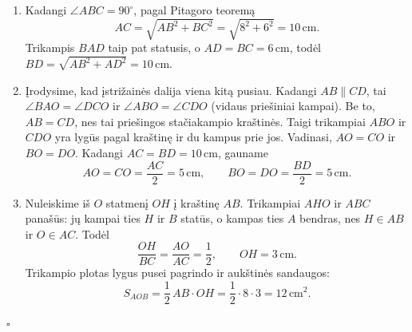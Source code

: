 \begin{sprendimas}
\begin{enumerate}[label=\alph*)]
\item Kadangi $\angle ABC=90^\circ$, pagal Pitagoro teoremą
\[
  AC=\sqrt{AB^2+BC^2}=\sqrt{8^2+6^2}=10\,\text{cm}.
\]
Trikampis $BAD$ taip pat statusis, o $AD=BC=6\,\text{cm}$, todėl
$BD=\sqrt{AB^2+AD^2}=10\,\text{cm}$.

\item Įrodysime, kad įstrižainės dalija viena kitą pusiau.
Kadangi $AB\parallel CD$, tai $\angle BAO=\angle DCO$ ir
$\angle ABO=\angle CDO$ (vidaus priešiniai kampai).
Be to, $AB=CD$, nes tai priešingos stačiakampio kraštinės.
Taigi trikampiai $ABO$ ir $CDO$ yra lygūs pagal kraštinę ir du
kampus prie jos. Vadinasi, $AO=CO$ ir $BO=DO$.
Kadangi $AC=BD=10\,\text{cm}$, gauname
\[
  AO=CO=\frac{AC}{2}=5\,\text{cm},\qquad
  BO=DO=\frac{BD}{2}=5\,\text{cm}.
\]

\item Nuleiskime iš $O$ statmenį $OH$ į kraštinę $AB$.
Trikampiai $AHO$ ir $ABC$ panašūs: jų kampai ties $H$ ir $B$
statūs, o kampas ties $A$ bendras, nes $H\in AB$ ir $O\in AC$.
Todėl
\[
  \frac{OH}{BC}=\frac{AO}{AC}=\frac12,
  \qquad OH=3\,\text{cm}.
\]
Trikampio plotas lygus pusei pagrindo ir aukštinės sandaugos:
\[
  S_{AOB}=\frac12\,AB\cdot OH
  =\frac12\cdot8\cdot3=12\,\text{cm}^2.
\]
\end{enumerate}
\hfill$\square$
\end{sprendimas}
